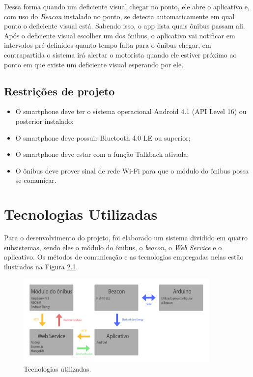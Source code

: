 \documentclass[
	12pt,				%
	oneside,			%
	a4paper,			%
	brazil				%
]{abntex2}
\begin{document}
Dessa forma quando um deficiente visual chegar no ponto, ele abre o aplicativo e, com uso do \textit{Beacon} instalado no ponto, se detecta automaticamente em qual ponto o deficiente visual está. Sabendo isso, o app lista quais ônibus passam ali. Após o deficiente visual escolher um dos ônibus, o aplicativo vai notificar em intervalos pré-definidos quanto tempo falta para o ônibus chegar, em contrapartida o sistema irá alertar o motorista quando ele estiver próximo ao ponto em que existe um deficiente visual esperando por ele.

\section{Restrições de projeto}

\begin{itemize}
\item O smartphone deve ter o sistema operacional Android 4.1 (API Level 16) ou posterior instalado;
\item O smartphone deve possuir Bluetooth 4.0 LE ou superior;
\item O smartphone deve estar com a função Talkback ativada;
\item O ônibus deve prover sinal de rede Wi-Fi para que o módulo do ônibus possa se comunicar.
\end{itemize}

\chapter{Tecnologias Utilizadas}

Para o desenvolvimento do projeto, foi elaborado um sistema dividido em quatro subsistemas, sendo eles o módulo do ônibus, o \textit{beacon}, o \textit{Web Service} e o aplicativo. Os métodos de comunicação e as tecnologias empregadas nelas estão ilustrados na Figura \ref{tecnologias}. 

\begin{figure}[H]
\centering
\includegraphics[width=10cm, center]{images/tech}
\caption{Tecnologias utilizadas.}
\label{tecnologias}
\end{figure}
\end{document}
